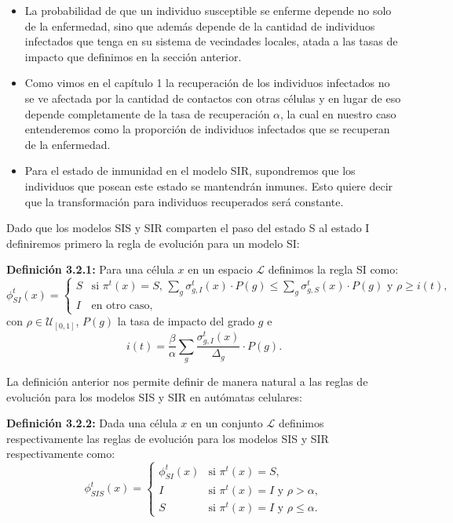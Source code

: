 \begin{itemize}
    \item La probabilidad de que un individuo susceptible se enferme depende no solo de la enfermedad, sino que además depende de la cantidad de individuos infectados que tenga en su sistema de vecindades locales, atada a las tasas de impacto que definimos en la sección anterior. 
    \item Como vimos en el capítulo 1 la recuperación de los individuos infectados no se ve afectada por la cantidad de contactos con otras células y en lugar de eso depende completamente de la tasa de recuperación $\alpha$, la cual en nuestro caso entenderemos como la proporción de individuos infectados que se recuperan de la enfermedad.
    \item Para el estado de inmunidad en el modelo SIR, supondremos que los individuos que posean este estado se mantendrán inmunes. Esto quiere decir que la transformación para individuos recuperados será constante.
\end{itemize}

Dado que los modelos SIS y SIR comparten el paso del estado S al estado I definiremos primero la regla de evolución para un modelo SI:

\textbf{Definición 3.2.1:} Para una célula $x$ en un espacio $\mathcal{L}$ definimos la regla SI como:
\begin{equation}
    \phi_{SI}^t(x)=\left\{\begin{array}{ll}
        S & \text{si }\pi^t(x)=S\text{, }\sum_g{\sigma_{g,I}^t(x)\cdot P(g)}\leq \sum_g{\sigma_{g,S}^t(x)\cdot P(g)}\text{ y }\rho\geq i(t),\\
        I & \text{en otro caso,}
    \end{array}\right.
\end{equation}
con $\rho\in\mathcal{U}_{[0,1]}$, $P(g)$ la tasa de impacto del grado $g$ e
\begin{equation}
    i(t) = \frac{\beta}{\alpha}\sum_g{\frac{\sigma_{g,I}^t(x)}{\Delta_g}}\cdot P(g).
\end{equation}

La definición anterior nos permite definir de manera natural a las reglas de evolución para los modelos SIS y SIR en autómatas celulares:

\textbf{Definición 3.2.2:} Dada una célula $x$ en un conjunto $\mathcal{L}$ definimos respectivamente las reglas de evolución para los modelos SIS y SIR respectivamente como:
\begin{equation}
    \phi_{SIS}^t(x)=\left\{\begin{array}{ll}
        \phi_{SI}^t(x) & \text{si }\pi^t(x) = S,\\
        I & \text{si }\pi^t(x)=I\text{ y }\rho>\alpha,\\
        S & \text{si }\pi^t(x)=I\text{ y }\rho\leq\alpha.
    \end{array}\right.
\end{equation}

